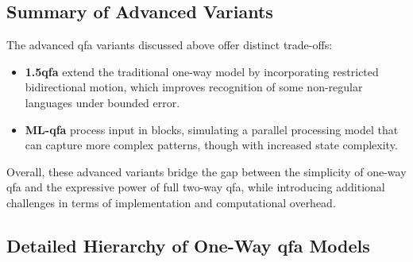 \subsection*{Summary of Advanced Variants}
The advanced qfa variants discussed above offer distinct trade-offs:
\begin{itemize}
    \item \textbf{1.5qfa} extend the traditional one-way model by incorporating restricted bidirectional motion, which improves recognition of some non-regular languages under bounded error.
    \item \textbf{ML-qfa} process input in blocks, simulating a parallel processing model that can capture more complex patterns, though with increased state complexity.
\end{itemize}
Overall, these advanced variants bridge the gap between the simplicity of one-way qfa and the expressive power of full two-way qfa, while introducing additional challenges in terms of implementation and computational overhead.


\subsection*{Detailed Hierarchy of One-Way qfa Models}
\label{subsec:hierarchy-diagram}

